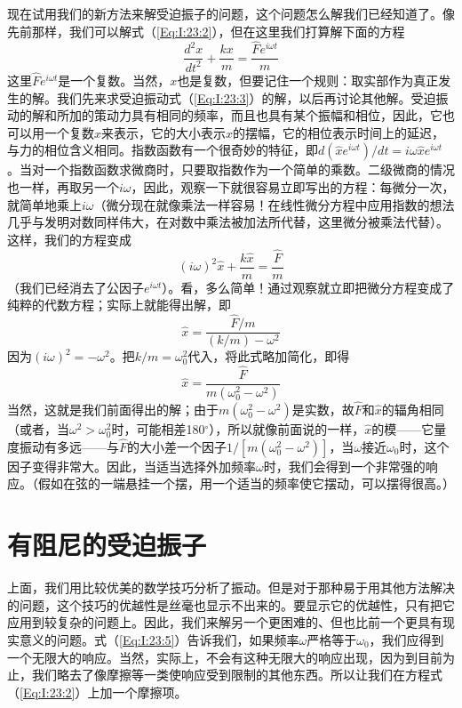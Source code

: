 现在试用我们的新方法来解受迫振子的问题，这个问题怎么解我们已经知道了。像先前那样，我们可以解式（\ref{Eq:I:23:2}），但在这里我们打算解下面的方程
\begin{equation}
    \label{Eq:I:23:3}
    \frac{d^2x}{dt^2} + \frac{kx}{m} = \frac{\hat{F}e^{i\omega t}}{m}
\end{equation}
这里$\hat{F}e^{i\omega t}$是一个复数。当然，$x$也是复数，但要记住一个规则：取实部作为真正发生的解。我们先来求受迫振动式（\ref{Eq:I:23:3}）的解，以后再讨论其他解。受迫振动的解和所加的策动力具有相同的频率，而且也具有某个振幅和相位，因此，它也可以用一个复数$\hat{x}$来表示，它的大小表示$x$的摆幅，它的相位表示时间上的延迟，与力的相位含义相同。指数函数有一个很奇妙的特征，即$d(\hat{x}e^{i\omega t})/dt=i\omega\hat{x}e^{i\omega t}$。当对一个指数函数求微商时，只要取指数作为一个简单的乘数。二级微商的情况也一样，再取另一个$i\omega$，因此，观察一下就很容易立即写出的方程：每微分一次，就简单地乘上$i\omega$（微分现在就像乘法一样容易！在线性微分方程中应用指数的想法几乎与发明对数同样伟大，在对数中乘法被加法所代替，这里微分被乘法代替）。这样，我们的方程变成
\begin{equation}
    \label{Eq:I:23:4}
    (i\omega)^2\hat{x} + \frac{k\hat{x}}{m} = \frac{\hat{F}}{m}
\end{equation}
（我们已经消去了公因子$e^{i\omega t}$）。看，多么简单！通过观察就立即把微分方程变成了纯粹的代数方程；实际上就能得出解，即
\begin{equation*}
    \hat{x} = \frac{\hat{F}/m}{(k/m)-\omega^2}
\end{equation*}
因为$(i\omega)^2=-\omega^2$。把$k/m=\omega_0^2$代入，将此式略加简化，即得
\begin{equation}
    \label{Eq:I:23:5}
    \hat{x} = \frac{\hat{F}}{m(\omega_0^2 - \omega^2)}
\end{equation}
当然，这就是我们前面得出的解；由于$m(\omega_0^2 -\omega^2)$是实数，故$\hat{F}$和$\hat{x}$的辐角相同（或者，当$\omega^2>\omega_0^2$时，可能相差180$^\circ$），所以就像前面说的一样，$\hat{x}$的模——它量度振动有多远——与$\hat{F}$的大小差一个因子$1/[m(\omega_0^2 - \omega^2)]$，当$\omega$接近$\omega_0$时，这个因子变得非常大。因此，当适当选择外加频率$\omega$时，我们会得到一个非常强的响应。（假如在弦的一端悬挂一个摆，用一个适当的频率使它摆动，可以摆得很高。）

\section{有阻尼的受迫振子}

上面，我们用比较优美的数学技巧分析了振动。但是对于那种易于用其他方法解决的问题，这个技巧的优越性是丝毫也显示不出来的。要显示它的优越性，只有把它应用到较复杂的问题上。因此，我们来解另一个更困难的、但也比前一个更具有现实意义的问题。式（\ref{Eq:I:23:5}）告诉我们，如果频率$\omega$严格等于$\omega_0$，我们应得到一个无限大的响应。当然，实际上，不会有这种无限大的响应出现，因为到目前为止，我们略去了像摩擦等一类使响应受到限制的其他东西。所以让我们在方程式（\ref{Eq:I:23:2}）上加一个摩擦项。

